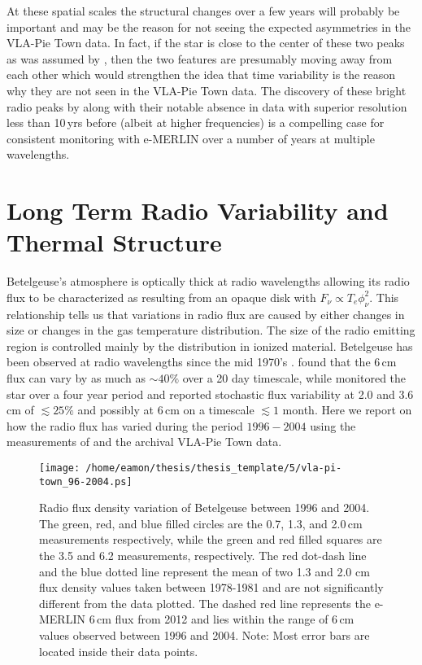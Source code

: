 At these spatial scales the structural changes over a few years will probably be important and may be the reason for not seeing the expected asymmetries in the VLA-Pie Town data. In fact, if the star is close to the center of these two peaks as was assumed by \cite{richards_2013}, then the two features are presumably moving away from each other which would strengthen the idea that time variability is the reason why they are not seen in the VLA-Pie Town data. The discovery of these bright radio peaks by \cite{richards_2013} along with their notable absence in data with superior resolution less than 10\,yrs before (albeit at higher frequencies) is a compelling case for consistent monitoring with e-MERLIN over a number of years at multiple wavelengths.

\section{Long Term Radio Variability and Thermal Structure}\label{sec:5.14}
Betelgeuse's atmosphere is optically thick at radio wavelengths allowing its radio flux to be characterized as resulting from an opaque disk with $F_{\nu} \propto T_{e}\phi _{\nu}^2$. This relationship tells us that variations in radio flux are caused by either changes in size or changes in the gas temperature distribution. The size of the radio emitting region is controlled mainly by the distribution in ionized material. Betelgeuse has been observed at radio wavelengths since the mid 1970's \cite[e.g.][]{newell_1982}. \cite{bookbinder_1987} found that the 6\,cm flux can vary by as much as $\sim 40\%$ over a 20 day timescale, while \cite{drake_1992} monitored the star over a four year period and reported stochastic flux variability at 2.0 and 3.6\,cm of $\lesssim 25\%$ and possibly at 6\,cm on a timescale $\lesssim 1$ month. Here we report on how the radio flux has varied during the period $1996-2004$ using the measurements of \cite{lim_1998} and the archival VLA-Pie Town data.

\begin{figure}[t!]
\centering
          \texttt{[image: /home/eamon/thesis/thesis\_template/5/vla-pi-town\_96-2004.ps]}
\caption[Radio flux density variation of Betelgeuse between $1996\rightarrow 2004$]{Radio flux density variation of Betelgeuse between 1996 and 2004. The green, red, and blue filled circles are the 0.7, 1.3, and 2.0\,cm measurements respectively, while the green and red filled squares are the 3.5 and 6.2 measurements, respectively. The red dot-dash line and the blue dotted line represent the mean of two 1.3 and 2.0 cm flux density values taken between 1978-1981 and are not significantly different from the data plotted. The dashed red line represents the e-MERLIN 6\,cm flux from 2012 and lies within the range of 6\,cm values observed between 1996 and 2004. Note: Most error bars are located inside their data points.}
\label{fig:5.16}
\end{figure}

